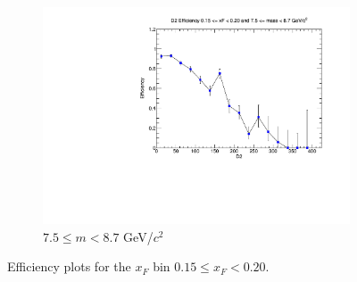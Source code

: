 \documentclass[11pt]{article}
\begin{document}
\begin{figure}[p]
\begin{subfigure}[b]{0.32\textwidth}
        \includegraphics[width=\textwidth]{./kTrackerEfficiencyPlots/D2_Efficiency_xF3_mass10.pdf}
        \caption{$7.5 \leq m < 8.7$ GeV/$c^2$}
    \end{subfigure}
    \caption{Efficiency plots for the $x_F$ bin $0.15 \leq x_F < 0.20$.}
\end{figure}
\end{document}

